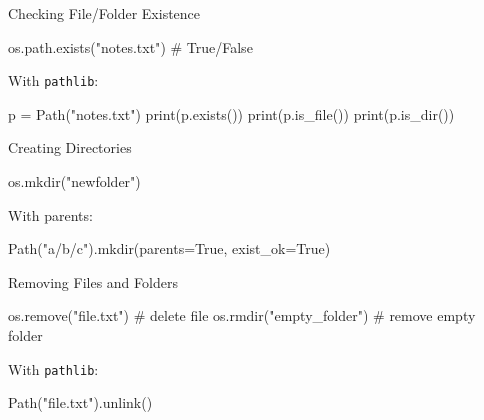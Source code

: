 \documentclass[
  letterpaper,
  DIV=11,
  numbers=noendperiod]{scrreprt}
\newenvironment{Shaded}{\begin{snugshade}}{\end{snugshade}}
\newcommand{\BuiltInTok}[1]{\textcolor[rgb]{0.00,0.23,0.31}{#1}}
\newcommand{\CommentTok}[1]{\textcolor[rgb]{0.37,0.37,0.37}{#1}}
\newcommand{\NormalTok}[1]{\textcolor[rgb]{0.00,0.23,0.31}{#1}}
\newcommand{\OperatorTok}[1]{\textcolor[rgb]{0.37,0.37,0.37}{#1}}
\newcommand{\StringTok}[1]{\textcolor[rgb]{0.13,0.47,0.30}{#1}}
\newcommand{\VariableTok}[1]{\textcolor[rgb]{0.07,0.07,0.07}{#1}}
\begin{document}
Checking File/Folder Existence

\begin{Shaded}
\begin{Highlighting}[]
\NormalTok{os.path.exists(}\StringTok{"notes.txt"}\NormalTok{)   }\CommentTok{\# True/False}
\end{Highlighting}
\end{Shaded}

With \texttt{pathlib}:

\begin{Shaded}
\begin{Highlighting}[]
\NormalTok{p }\OperatorTok{=}\NormalTok{ Path(}\StringTok{"notes.txt"}\NormalTok{)}
\BuiltInTok{print}\NormalTok{(p.exists())}
\BuiltInTok{print}\NormalTok{(p.is\_file())}
\BuiltInTok{print}\NormalTok{(p.is\_dir())}
\end{Highlighting}
\end{Shaded}

Creating Directories

\begin{Shaded}
\begin{Highlighting}[]
\NormalTok{os.mkdir(}\StringTok{"newfolder"}\NormalTok{)}
\end{Highlighting}
\end{Shaded}

With parents:

\begin{Shaded}
\begin{Highlighting}[]
\NormalTok{Path(}\StringTok{"a/b/c"}\NormalTok{).mkdir(parents}\OperatorTok{=}\VariableTok{True}\NormalTok{, exist\_ok}\OperatorTok{=}\VariableTok{True}\NormalTok{)}
\end{Highlighting}
\end{Shaded}

Removing Files and Folders

\begin{Shaded}
\begin{Highlighting}[]
\NormalTok{os.remove(}\StringTok{"file.txt"}\NormalTok{)      }\CommentTok{\# delete file}
\NormalTok{os.rmdir(}\StringTok{"empty\_folder"}\NormalTok{)   }\CommentTok{\# remove empty folder}
\end{Highlighting}
\end{Shaded}

With \texttt{pathlib}:

\begin{Shaded}
\begin{Highlighting}[]
\NormalTok{Path(}\StringTok{"file.txt"}\NormalTok{).unlink()}
\end{Highlighting}
\end{Shaded}
\end{document}
